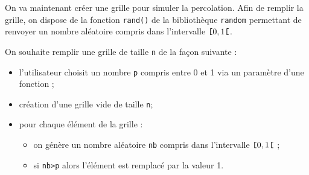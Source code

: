 %
%
%
%
%
%


On va maintenant créer une grille pour simuler la percolation. 
Afin de remplir la grille, on dispose de la fonction \lstinline{rand()} de la bibliothèque \lstinline{random} permettant de renvoyer un nombre aléatoire compris dans l'intervalle $\verb![!0,1\verb![!$.

On souhaite remplir une grille de taille \lstinline{n} de la façon suivante : 
\begin{itemize}
\item l'utilisateur choisit un nombre \lstinline{p} compris entre 0 et 1 via un paramètre d'une fonction ;
\item création d'une grille vide de taille \lstinline{n};
\item pour chaque élément de la grille :
\begin{itemize}
\item on génère un nombre aléatoire \lstinline{nb} compris dans l'intervalle $\verb![!0,1\verb![!$ ;
\item si \lstinline{nb>p} alors l'élément est remplacé par la valeur 1. 
\end{itemize}
\end{itemize}


